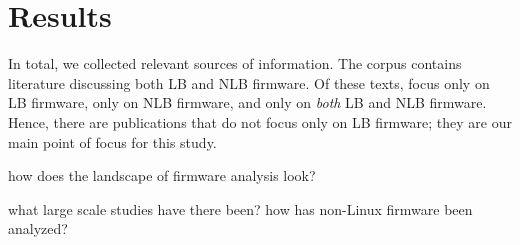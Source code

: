 \section{Results}
In total, we collected  relevant sources of information.
The corpus contains literature discussing both LB and NLB firmware.
Of these  texts,  focus only on LB firmware,  only on NLB firmware, and  only on \textit{both} LB and NLB firmware.
Hence, there are  publications that do not focus only on LB firmware; they are our main point of focus for this study.

how does the landscape of firmware analysis look?

what large scale studies have there been?
how has non-Linux firmware been analyzed?








